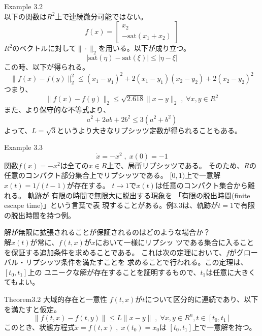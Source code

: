 \documentclass{jsarticle}
\begin{document}
Example 3.2\\
以下の関数は$R^2$上で連続微分可能ではない。
\begin{equation*}
  f(x) = \left[
    \begin{matrix}
      x_2 \\ -\text{sat} (x_1+x_2)
    \end{matrix}
  \right]
\end{equation*}
$R^2$のベクトルに対して$\|\cdot\|_2$を用いる。以下が成り立つ。
\begin{equation*}
  |\text{sat}(\eta)-\text{sat}(\xi) |\leq |\eta - \xi|
\end{equation*}
この時、以下が得られる。
\begin{equation*}
  \|f(x)-f(y) \|_2^2 \leq (x_1-y_1)^2 + 2(x_1-y_1)(x_2-y_2)+2(x_2-y_2)^2
\end{equation*}
つまり、
\begin{equation*}
  \|f(x)-f(y) \|_2\leq \sqrt{2.618}\|x-y\|_2\;,\;\forall x,y \in R^2
\end{equation*}
また、より保守的な不等式より、
\begin{equation*}
  a^2+2ab+2b^2 \leq 3(a^2+b^2)
\end{equation*}
よって、$L=\sqrt{3}$というより大きなリプシッツ定数が得られることもある。

Example 3.3
\begin{equation*}
  \dot x = -x^2\;,\;x(0)= -1
\end{equation*}
関数$f(x)=-x^2$は全ての$x\in R$上で、局所リプシッツである。
そのため、$R$の任意のコンパクト部分集合上でリプシッツである。
$[0,1)$上で一意解$x(t)=1/(t-1)$が存在する。
$t\rightarrow 1$で$x(t)$は任意のコンパクト集合から離れる。
軌跡が 有限の時間で無限大に脱出する現象を 「有限の脱出時間(finite escape time)」という言葉で表
現することがある。例3.3は、軌跡が$t = 1$で有限の脱出時間を持つ例。

解が無限に拡張されることが保証されるのはどのような場合か？\\
解$x(t)$が常に、$f(t, x)$が$x$において一様にリプシッ
ツである集合に入ることを保証する追加条件を求めることである。
これは次の定理において、$f$がグローバル・リプシッツ条件を満たすことを
求めることで行われる。この定理は、$[t_0,t_1]$上の
ユニークな解が存在することを証明するもので、$t_1$は任意に大きくてもよい。

\begin{itembox}[l]{Theorem3.2 大域的存在と一意性}
  $f(t,x)$が$t$について区分的に連続であり、以下を満たすと仮定。
  \begin{equation*}
    \|f(t,x)-f(t,y)\| \leq L\|x-y\|\;,\;\forall x,y \in R^n,t\in [t_0,t_1]
  \end{equation*}
  このとき、状態方程式$\dot x=f(t,x)\;,\;x(t_0)=x_0$は
  $[t_0,t_1]$上で一意解を持つ。
\end{itembox}
\end{document}
